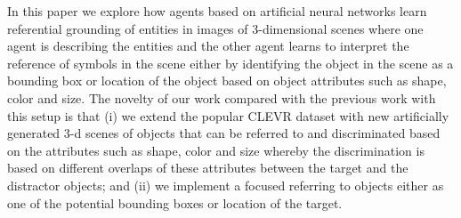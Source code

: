 \documentclass[11pt]{article}
\begin{document}
In this paper we explore how agents based on artificial neural networks learn referential grounding of entities in images of 3-dimensional scenes where one agent is describing the entities and the other agent learns to interpret the reference of symbols in the scene either by identifying the object in the scene as a bounding box or location of the object based on object attributes such as shape, color and size.
The novelty of our work compared with the previous work with this setup \citep{Kharitonov2019} is that (i) we extend the popular CLEVR dataset \citep{Johnson2016} with new artificially generated 3-d scenes of objects that can be referred to and discriminated based on the attributes such as shape, color and size whereby the discrimination is based on different overlaps of these attributes between the target and the distractor objects; and (ii) we implement a focused referring to objects either as one of the potential bounding boxes or location of the target.



\end{document}
